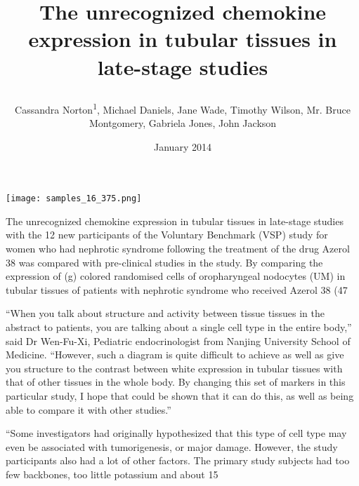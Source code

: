 \documentclass{article}
\title{

The unrecognized chemokine expression in tubular tissues in late-stage studies}
\author{Cassandra Norton\textsuperscript{1},  Michael Daniels,  Jane Wade,  Timothy Wilson,  Mr. Bruce Montgomery,  Gabriela Jones,  John Jackson}
\affil{\textsuperscript{1}Australian Catholic University}
\date{January 2014}
\begin{document}
\maketitle

\begin{center}
\begin{minipage}{0.75\linewidth}
\texttt{[image: samples\_16\_375.png]}
\end{minipage}
\end{center}



The unrecognized chemokine expression in tubular tissues in late-stage studies with the 12 new participants of the Voluntary Benchmark (VSP) study for women who had nephrotic syndrome following the treatment of the drug Azerol 38 was compared with pre-clinical studies in the study. By comparing the expression of (g) colored randomised cells of oropharyngeal nodocytes (UM) in tubular tissues of patients with nephrotic syndrome who received Azerol 38 (47%

“When you talk about structure and activity between tissue tissues in the abstract to patients, you are talking about a single cell type in the entire body,” said Dr Wen-Fu-Xi, Pediatric endocrinologist from Nanjing University School of Medicine. “However, such a diagram is quite difficult to achieve as well as give you structure to the contrast between white expression in tubular tissues with that of other tissues in the whole body. By changing this set of markers in this particular study, I hope that could be shown that it can do this, as well as being able to compare it with other studies.”

“Some investigators had originally hypothesized that this type of cell type may even be associated with tumorigenesis, or major damage. However, the study participants also had a lot of other factors. The primary study subjects had too few backbones, too little potassium and about 15%
\end{document}
